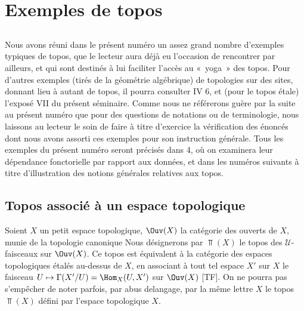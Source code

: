 \documentclass[10pt]{../fichiers-configuration-latex/smfart}
\begin{document}
\section{Exemples de topos}

\setcounter{subsection}{-1}
\subsection{}
Nous avons réuni dans le présent numéro un assez grand nombre
d'exemples typiques de topos, que le lecteur aura déjà eu l'occasion
de rencontrer par ailleurs, et qui sont destinés à lui faciliter
l'accès au « yoga »  des topos. Pour d'autres exemples (tirés de
la géométrie algébrique) de topologies sur des sites, donnant lieu à
autant de topos, il pourra consulter  IV 6, et (pour le topos
étale) l'exposé VII du présent séminaire. Comme nous ne référerons
guère par la suite au présent numéro que pour des questions de
notations ou de terminologie, nous laissons au lecteur le soin de
faire à titre d'exercice la vérification des énoncés dont nous avons
assorti ces exemples pour son instruction générale. Tous les
exemples du présent numéro seront précisés dans 4, où on examinera
leur dépendance fonctorielle par rapport aux données, et dans les
numéros suivants à titre d'illustration des notions générales
relatives aux topos.

\subsection{Topos associé à un espace topologique}

Soient $X$ un petit espace topologique, $\Ouv(X)$ la catégorie des
ouverts de $X$, munie de la topologie canonique  Nous
désignerons par $\Top(X)$ le topos des $𝒰$-faisceaux sur
$\Ouv(X)$. Ce topos est équivalent à la catégorie des espaces
topologiques étalés au-dessus de $X$, en associant à tout tel espace
$X'$ sur $X$ le faisceau $U\mapsto \Gamma(X'/U)=\Hom_X(U,X')$ sur
$\Ouv(X)$ [TF]. On ne pourra pas s'empêcher de noter parfois, par
abus de\pageoriginale langage, par la même lettre $X$ le topos
$\Top(X)$ défini par l'espace topologique $X$.
\end{document}
